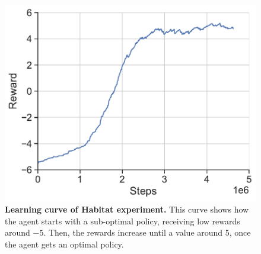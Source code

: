 \begin{figure}
    \centering
    \includegraphics[width=0.7\linewidth]{figures/understanding_vsn/habitat_reward}
    \caption{\textbf{Learning curve of Habitat experiment.} This curve shows how the agent starts with a sub-optimal policy, receiving low rewards around $-5$. Then, the rewards increase until a value around 5, once the agent gets an optimal policy.}
    \label{fig:reward-habitat-results}
\end{figure}


